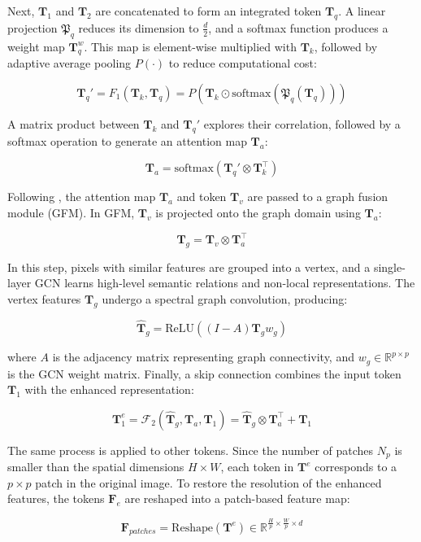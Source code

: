 \noindent Next, $\mathbf{T}_1$ and $\mathbf{T}_2$ are concatenated to form an integrated token $\mathbf{T}_q$. A linear projection $\mathfrak{P}_q$ reduces its dimension to $\frac{d}{2}$, and a softmax function produces a weight map $\mathbf{T}_q^w$. This map is element-wise multiplied with $\mathbf{T}_k$, followed by adaptive average pooling $P(\cdot)$ to reduce computational cost:

\[
\mathbf{T}_q' = F_1(\mathbf{T}_k, \mathbf{T}_q) = P\left(\mathbf{T}_k \odot \text{softmax}(\mathfrak{P}_q(\mathbf{T}_q))\right)
\]

\noindent A matrix product between $\mathbf{T}_k$ and $\mathbf{T}_q'$ explores their correlation, followed by a softmax operation to generate an attention map $\mathbf{T}_a$:

\[
\mathbf{T}_a = \text{softmax}\left(\mathbf{T}_q' \otimes \mathbf{T}_k^\top\right)
\]

\noindent Following \cite{te2020edge}, the attention map $\mathbf{T}_a$ and token $\mathbf{T}_v$ are passed to a graph fusion module (GFM). In GFM, $\mathbf{T}_v$ is projected onto the graph domain using $\mathbf{T}_a$:

\[
\mathbf{T}_g = \mathbf{T}_v \otimes \mathbf{T}_a^\top
\]

\noindent In this step, pixels with similar features are grouped into a vertex, and a single-layer GCN learns high-level semantic relations and non-local representations. The vertex features $\mathbf{T}_g$ undergo a spectral graph convolution, producing:

\[
\hat{\mathbf{T}}_g = \text{ReLU}\left((I - A)\mathbf{T}_g w_g\right)
\]

\noindent where $A$ is the adjacency matrix representing graph connectivity, and $w_g \in \mathbb{R}^{p \times p}$ is the GCN weight matrix. Finally, a skip connection combines the input token $\mathbf{T}_1$ with the enhanced representation:

\[
\mathbf{T}_{1}^{e} = \mathcal{F}_2(\hat{\mathbf{T}}_g, \mathbf{T}_a, \mathbf{T}_1) = \hat{\mathbf{T}}_g \otimes \mathbf{T}_a^\top + \mathbf{T}_1
\]

\noindent The same process is applied to other tokens. Since the number of patches $N_p$ is smaller than the spatial dimensions $H \times W$, each token in $\mathbf{T}^{e}$ corresponds to a $p \times p$ patch in the original image. To restore the resolution of the enhanced features, the tokens $\mathbf{F}_{e}$ are reshaped into a patch-based feature map:

\begin{equation}
    \mathbf{F}_{patches} = \text{Reshape}(\mathbf{T}^{e}) \in \mathbb{R}^{\frac{H}{p} \times \frac{W}{p} \times d}
\end{equation}

